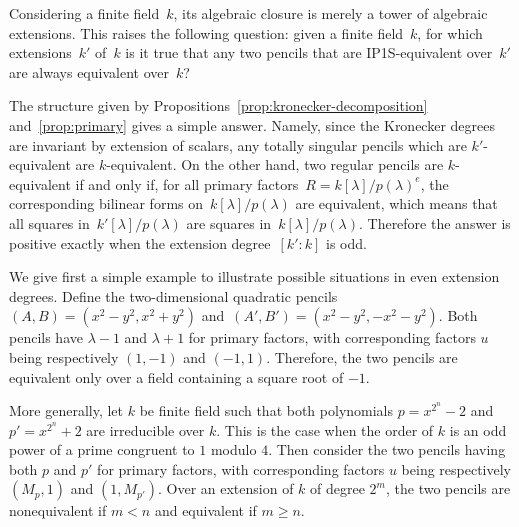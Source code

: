 \documentclass{amsart}
\begin{document}
Considering a finite field~$k$, its algebraic closure is merely
a tower of algebraic extensions.
This raises the following question: given a finite field~$k$,
for which extensions~$k'$ of~$k$ is it true that
any two pencils that are IP1S-equivalent over~$k'$
are always equivalent over~$k$?

The structure given by Propositions~\ref{prop:kronecker-decomposition}
and~\ref{prop:primary} gives a simple answer.
Namely, since the Kronecker degrees are invariant by extension of scalars,
any totally singular pencils which are $k'$-equivalent are $k$-equivalent.
On the other hand, two regular pencils are $k$-equivalent
if and only if, for all primary factors~$R =k[λ]/p(λ)^e$,
the corresponding bilinear forms on~$k[λ]/p(λ)$ are equivalent,
which means that all squares in~$k'[λ]/p(λ)$
are squares in~$k[λ]/p(λ)$.
Therefore the answer is positive exactly when
the extension degree~$[k':k]$ is odd.

We give first a simple example to illustrate possible situations in even extension degrees.
Define the two-dimensional
quadratic pencils~$(A,B) = (x^2 - y^2, x^2 + y^2)$
and~$(A', B') = (x^2 - y^2, - x^2 - y^2)$. Both pencils have $\lambda-1$ and $\lambda+1$ for primary factors,
with corresponding factors $u$ being respectively $(1,-1)$ and $(-1,1)$.
Therefore, the two pencils are equivalent only over a field
containing a square root of $-1$.

More generally, let $k$ be finite field such that both polynomials $p=x^{2^n}-2$
and $p'=x^{2^n}+2$ are irreducible over $k$. This is the case when the 
order of $k$ is an odd power of a prime congruent to $1$ modulo $4$.
Then consider the two pencils having both $p$ and $p'$ for primary factors,
with corresponding factors $u$ being respectively $(M_p,1)$ and $(1,M_{p'})$.
Over an extension of $k$ of degree $2^m$, the two pencils are nonequivalent if $m < n$ and 
equivalent if $m \ge n$.
\end{document}
